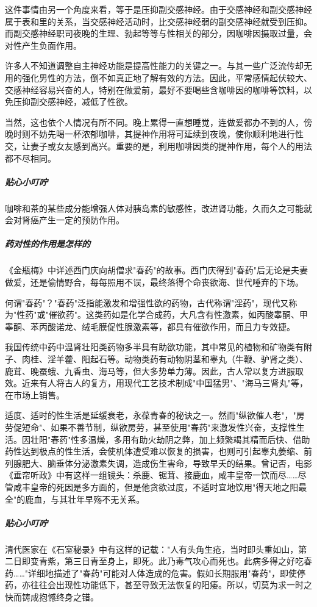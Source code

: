\begin{enumerate}
这件事情由另一个角度来看，等于是压抑副交感神经。由于交感神经和副交感神经属于表和里的关系，当交感神经活动时，比交感神经弱的副交感神经就受到压抑。而副交感神经职司夜晚的生理、勃起等等与性相关的部分，因咖啡因摄取过量，会对性产生负面作用。

许多人不知道调整自主神经功能是提高性能力的关键之一。与其一些广泛流传却无用的强化男性的方法，倒不如真正地了解有效的方法。因此，平常感情起伏较大、交感神经容易兴奋的人，特别在做爱前，最好不要喝些含咖啡因的咖啡等饮料，以免压抑副交感神经，减低了性欲。

当然，这也依个人情况有所不同。晚上累得一直想睡觉，连做爱都办不到的人，傍晚时则不妨先喝一杯浓郁咖啡，其提神作用将可延续到夜晚，使你顺利地进行性交，让妻子或女友感到高兴。重要的是，利用咖啡因类的提神作用，每个人的用法都不尽相同。

\subparagraph{贴心小叮咛}

咖啡和茶的某些成分能增强人体对胰岛素的敏感性，改进肾功能，久而久之可能就会对肾癌产生一定的预防作用。

\subparagraph{药对性的作用是怎样的}

《金瓶梅》中详述西门庆向胡僧求"春药"的故事。西门庆得到"春药"后无论是夫妻做爱，还是偷情野合，每每照用不误，最终落得个命丧欲海、世代唾弃的下场。

何谓"春药"？"春药"泛指能激发和增强性欲的药物，古代称谓"淫药"，现代又称为"性药"或"催欲药"。这类药如是化学合成药，大凡含有性激素，如丙酸睾酮、甲睾酮、苯丙酸诺龙、绒毛膜促性腺激素等，都具有催欲作用，而且力专效捷。

我国传统中药中温肾壮阳类药物多半具有助欲功能，其中常见的植物和矿物类有附子、肉桂、淫羊藿、阳起石等。动物类药有动物阴茎和睾丸（牛鞭、驴肾之类）、鹿茸、晚蚕蛾、九香虫、海马等，但大多势单力薄。因此，古人常以复方进服取效。近来有人将古人的复方，用现代工艺技术制成"中国猛男"、"海马三肾丸"等，在市场上销售。

适度、适时的性生活是延缓衰老，永葆青春的秘诀之一。然而"纵欲催人老"，"房劳促短命"、如果不善节制，纵欲房劳，甚至使用"春药"来激发性兴奋，支撑性生活。因壮阳"春药"性多温燥，多用有助火劫阴之弊，加上频繁竭其精而后快、借助药性达到极点的性生活，会使机体遭受难以恢复的损害，也则可引起睾丸萎缩、前列腺肥大、脑垂体分泌激素失调，造成伤生害命，导致早夭的结果。曾记否，电影《垂帘听政》中有这样一组镜头：杀鹿、锯茸、接鹿血，咸丰皇帝一饮而尽……尽管咸丰皇帝的死因是多方面的，但是他贪欲过度，不适时宜地饮用"得天地之阳最全"的鹿血，与其壮年早殇不无关系。

\subparagraph{贴心小叮咛}

清代医家在《石室秘录》中有这样的记载："人有头角生疮，当时即头重如山，第二日即变青紫，第三日青至身上，即死。此乃毒气攻心而死也。此病多得之好吃春药……"详细地描述了"春药"可能对人体造成的危害。假如长期服用"春药"，即使停药，亦往往会出现性功能低下，甚至导致无法恢复的阳痿。所以，切莫为求一时之快而铸成抱憾终身之错。


\end{enumerate}
